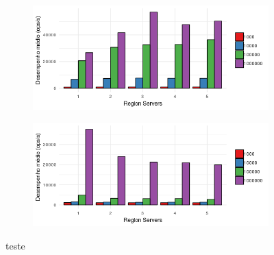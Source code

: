 \documentclass[12pt]{article}
\begin{document}
\begin{figure}
    \centering
    \begin{subfigure}[b]{0.49\textwidth}
        \centering
        \includegraphics[width=\textwidth]{images/figura15}
        \caption{}
        \label{fig:mean and std of net14}
    \end{subfigure}
        \hfill
    \begin{subfigure}[b]{0.49\textwidth}  
        \centering 
        \includegraphics[width=\textwidth]{images/figura16}
        \caption{}%
    \end{subfigure}
    \caption{teste}
\end{figure}
\end{document}
